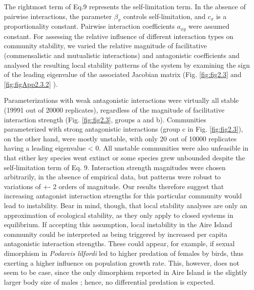 The rightmost term of Eq.9 represents the self-limitation term. In the absence of pairwise interactions, the parameter $\beta _x$ controls self-limitation, and $c_x$ is a proportionality constant. Pairwise interaction coefficients  $a_{\mathit{xy}}$ were assumed constant. For assessing the relative influence of different interaction types on community stability, we varied the relative magnitude of facilitative (commensalistic and mutualistic interactions) and antagonistic coefficients and analysed the resulting local stability patterns of the system by examining the sign of the leading eigenvalue of the associated Jacobian matrix (Fig. \ref{fig:fig2.3} and \cref{fig:figApp2.3.2} ).

Parameterizations with weak antagonistic interactions were virtually all stable (19991 out of 20000 replicates), regardless of the magnitude of facilitative interaction strength (Fig. \ref{fig:fig2.3}, groups a and b). Communities parameterized with strong antagonistic interactions (group c in Fig. \ref{fig:fig2.3}), on the other hand, were mostly unstable, with only 20 out of 10000 replicates having a leading eigenvalue {\textless} 0. All unstable communities were also unfeasible in that either key species went extinct or some species grew unbounded despite the self-limitation term of Eq. 9. Interaction strength magnitudes were chosen arbitrarily, in the absence of empirical data, but patterns were robust to variations of +- 2 orders of magnitude. Our results therefore suggest that increasing antagonist interaction strengths for this particular community would lead to instability. Bear in mind, though, that local stability analyses are only an approximation of ecological stability, as they only apply to closed systems in equilibrium. If accepting this assumption, local instability in the Aire Island community could be interpreted as being triggered by increased per capita antagonistic interaction strengths. These could appear, for example, if sexual dimorphism in \textit{Podarcis lilfordi} led to higher predation of females by birds, thus exerting a higher influence on population growth rate. This, however, does not seem to be case, since the only dimorphism reported in Aire Island is the slightly larger body size of males \citep{Perez-Mellado2000}; hence, no differential predation is expected.


